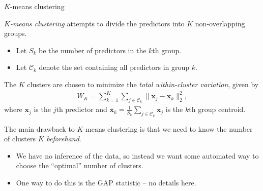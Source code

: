 \documentclass[8pt]{beamer}
\newcommand{\mys}{\vspace{0.5cm} %
}
\begin{document}
\begin{frame}{$K$-means clustering}

\textit{$K$-means clustering} attempts to divide the predictors into $K$ non-overlapping groups.
\begin{itemize}
    \item Let $S_k$ be the number of predictors in the $k$th group.
    \item Let $\mathcal{C}_k$ denote the set containing all predictors in group $k$.
\end{itemize} \mys

The $K$ clusters are chosen to minimize the \textit{total within-cluster variation}, given by 
\begin{align}
    \label{totwithinclusvar}
    W_K = \sum_{k=1}^K \sum_{j \in \mathcal{C}_k} \| \mathbf{x}_j - \bar{\mathbf{x}}_k \|_2^2,
\end{align}
where $\mathbf{x}_j$ is the $j$th predictor and $\bar{\mathbf{x}}_k = \frac{1}{S_k} \sum_{j \in \mathcal{C}_k} \mathbf{x}_j$ is the $k$th group centroid. \mys

The main drawback to $K$-means clustering is that we need to know the number of clusters $K$ \textit{beforehand}.
\begin{itemize}
    \item We have no inference of the data, so instead we want some automated way to choose the ``optimal'' number of clusters.
    \item One way to do this is the GAP statistic -- no details here.
\end{itemize}
    
\end{frame}
\end{document}
